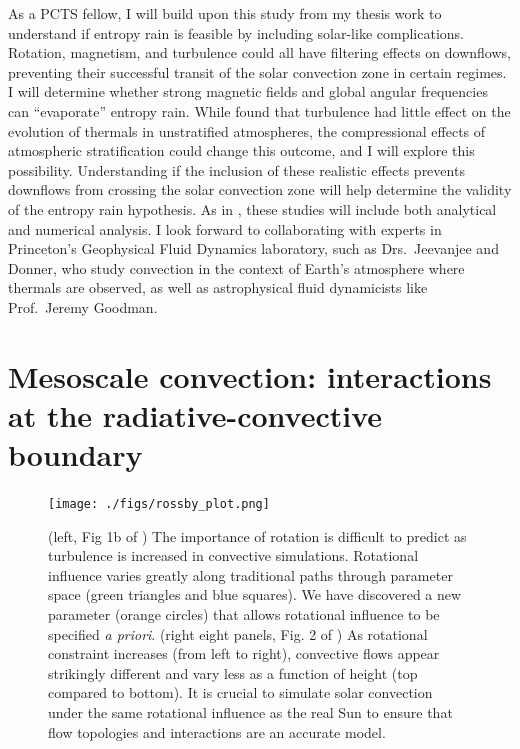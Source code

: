 \documentclass[11pt, preprint]{aastex}
\begin{document}
As a PCTS fellow, I will build upon this study from my thesis work to understand if entropy rain is feasible by including solar-like complications.
Rotation, magnetism, and turbulence could all have filtering effects on downflows, preventing their successful transit of the solar convection zone in certain regimes.
I will determine whether strong magnetic fields and global angular frequencies can ``evaporate'' entropy rain.
While \citet{lecoanet&jeevanjee2019} found that turbulence had little effect on the evolution of thermals in unstratified atmospheres, the compressional effects of atmospheric stratification could change this outcome, and I will explore this possibility.
Understanding if the inclusion of these realistic effects prevents downflows from crossing the solar convection zone will help determine the validity of the entropy rain hypothesis.
As in \citet{andersLB2019}, these studies will include both analytical and numerical analysis.
I look forward to collaborating with experts in Princeton's Geophysical Fluid Dynamics laboratory, such as Drs.~Jeevanjee and Donner, who study convection in the context of Earth's atmosphere where thermals are observed, as well as astrophysical fluid dynamicists like Prof.~Jeremy Goodman.

\vspace{-0.8cm}
\section{Mesoscale convection: interactions at the radiative-convective boundary}
\vspace{-0.3cm}
\label{sct:taskB}
\begin{figure}[t!]
    \texttt{[image: ./figs/rossby\_plot.png]}
    \caption{(left, Fig 1b of \citet{anders&all2019}) The importance of rotation is difficult to predict as turbulence is increased in convective simulations.
	Rotational influence varies greatly along traditional paths through parameter space (green triangles and blue squares).
	We have discovered a new parameter (orange circles) that allows rotational influence to be specified \emph{a priori}.
	(right eight panels, Fig. 2 of \citet{anders&all2019}) As rotational constraint increases (from left to right), convective flows appear strikingly different and vary less as a function of height (top compared to bottom).
	It is crucial to simulate solar convection under the same rotational influence as the real Sun to ensure that flow topologies and interactions are an accurate model.
	\label{fig:rossby_plot} }
\end{figure}
\end{document}
